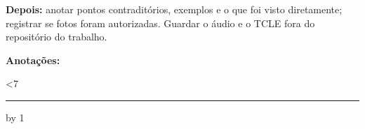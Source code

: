 \documentclass[11pt,a4paper]{article}
\begin{document}
\textbf{Depois:} anotar pontos contraditórios, exemplos e o que foi visto diretamente; registrar se fotos foram autorizadas. Guardar o áudio e o TCLE fora do repositório do trabalho.

\vspace{0.6em}
\textbf{Anotações:}\par
\newcount\linhas {}
\loop\ifnum\linhas<7 \rule{\linewidth}{0.25pt}\par\vspace{0.55em}\advance\linhas by 1 \repeat
\end{document}
